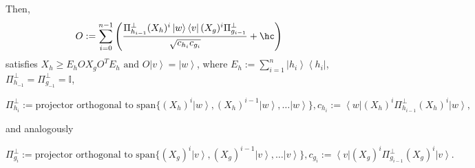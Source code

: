 \documentclass{theoretics}
\begin{document}
\begin{proposition}
\begin{itemize}
  \end{itemize}
  Then,
  \begin{displaymath}
    O:=\sum_{i=0}^{n-1}\left(\frac{\Pi_{h_{i-1}}^{\perp}(X_{h})^{i}\left|w\right\rangle \left\langle v\right|(X_{g})^{i}\Pi_{g_{i-1}}^{\perp}}{\sqrt{c_{h_{i}}c_{g_{i}}}}+\hc\right)
  \end{displaymath}
  satisfies
  $
    X_{h}\ge E_{h}OX_{g}O^{T}E_{h}\text{ and }O\left|v\right\rangle =\left|w\right\rangle
  $, where $E_{h}:=\sum_{i=1}^{n}\left|h_{i}\right\rangle \left\langle h_{i}\right|$,
  $\Pi_{h_{-1}}^{\perp}=\Pi_{g_{-1}}^{\perp}=\mathbb{I}$,
  \begin{footnotesize}
    \begin{displaymath}\Pi_{h_{i}}^{\perp}:=\text{projector orthogonal to }\text{span}\{(X_{h})^{i}\left|w\right\rangle ,(X_{h})^{i-1}\left|w\right\rangle ,\dots\left|w\right\rangle \},
      c_{h_{i}}:=\left\langle w\right|(X_{h})^{i}\Pi_{h_{i-1}}^{\perp}(X_{h})^{i}\left|w\right\rangle,\end{displaymath}
  \end{footnotesize}
  and analogously
  \begin{footnotesize}
    \begin{displaymath}
      \Pi_{g_{i}}^{\perp}:=\text{projector orthogonal to }\text{span}\{(X_{g})^{i}\left|v\right\rangle ,(X_{g})^{i-1}\left|v\right\rangle ,\dots\left|v\right\rangle \},
      c_{g_{i}}:=\left\langle v\right|(X_{g})^{i}\Pi_{g_{i-1}}^{\perp}(X_{g})^{i}\left|v\right\rangle. \end{displaymath}
  \end{footnotesize}

\end{proposition}
\end{document}
